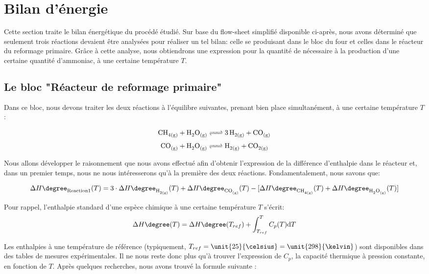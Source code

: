 
\section{Bilan d'énergie}

Cette section traite le bilan énergétique du procédé étudié.
Sur base du flow-sheet simplifié disponible ci-après, nous avons déterminé que seulement trois réactions
devaient être analysées pour réaliser un tel bilan: celle se produisant dans le bloc du four et celles dans 
le réacteur du reformage primaire. Grâce à cette analyse, nous obtiendrons une expression pour la
quantité de  nécessaire à la production d'une certaine quantité d'ammoniac, à une certaine température $T$.

\subsection{Le bloc "Réacteur de reformage primaire"}

Dans ce bloc, nous devons traiter les deux réactions à l'équilibre suivantes, prenant
bien place simultanément, à une certaine température $T$:

\begin{equation}\label{eq:Reaction1}
\ce{CH_{4(g)} + H_{2}O_{(g)} <=> 3H_{2(g)} + CO_{(g)}}
\end{equation}
\begin{equation}\label{eq:Reaction2} {\ce{CO_{(g)} + H_{2}O_{(g)} <=>  H_{2(g)} + CO_{2(g)}}}
\end{equation}


\bigbreak
Nous allons développer le raisonnement que nous avons effectué afin d'obtenir l'expression de la différence
d'enthalpie dans le réacteur et, dans un premier temps, nous ne nous intéresserons qu'à la première des
deux réactions. Fondamentalement, nous savons que:

$$\Delta H\degree_{\text{Reaction1}}(T)=3 \cdot \Delta H\degree_{\ce{H_{2(g)}}}(T) + \Delta H\degree_{\ce{CO_{(g)}}}(T) -
\lbrack\Delta H\degree_{\ce{CH_{4(g)}}}(T) + \Delta H\degree_{\ce{H_{2}O_{(g)}}}(T)\rbrack$$

Pour rappel, l'enthalpie standard d'une espèce chimique à une certaine température $T$ s'écrit: \begin{equation}\label{eq:deltaH}
\Delta H\degree(T)=\Delta H\degree(T_{ref})  + \displaystyle \int_{T_{ref}}^{T} C_{p}(T) \mathrm{d}T
\end{equation}


Les enthalpies à une température de référence (typiquement, $T_{ref}=\unit{25}{\celsius}=\unit{298}{\kelvin}$) sont
disponibles dans des tables de mesures expérimentales. Il ne nous reste donc plus qu'à trouver
l'expression de $C_p$, la capacité thermique à pression constante, en fonction de $T$.
Après quelques recherches, nous avons trouvé la formule suivante \cite{NIST}:

